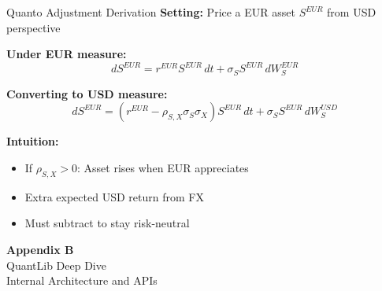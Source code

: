 \documentclass[aspectratio=169,11pt]{beamer}
\begin{document}
\begin{frame}{Quanto Adjustment Derivation}
\textbf{Setting:} Price a EUR asset $S^{EUR}$ from USD perspective

\textbf{Under EUR measure:}
\[
dS^{EUR} = r^{EUR} S^{EUR}\,dt + \sigma_S S^{EUR}\,dW_S^{EUR}
\]

\textbf{Converting to USD measure:}
\[
dS^{EUR} = (r^{EUR} - \rho_{S,X}\sigma_S\sigma_X) S^{EUR}\,dt + \sigma_S S^{EUR}\,dW_S^{USD}
\]

\textbf{Intuition:}
\begin{itemize}
    \item If $\rho_{S,X} > 0$: Asset rises when EUR appreciates
    \item Extra expected USD return from FX
    \item Must subtract to stay risk-neutral
\end{itemize}
\end{frame}


\begin{frame}{}
\begin{center}
\Huge\textbf{Appendix B}\\[1cm]
\Large QuantLib Deep Dive\\[0.5cm]
\normalsize Internal Architecture and APIs
\end{center}
\end{frame}
\end{document}
